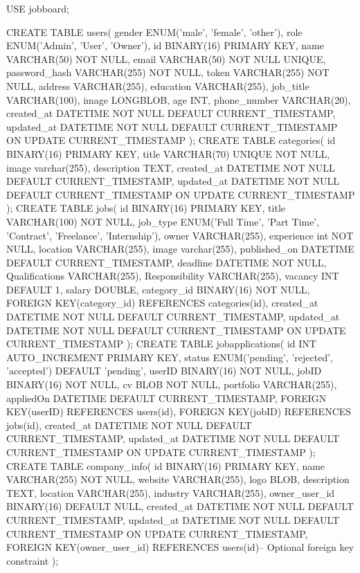 USE jobboard;

CREATE TABLE users(
    gender ENUM('male', 'female', 'other'),
    role ENUM('Admin', 'User', 'Owner'),
    id BINARY(16) PRIMARY KEY,
    name VARCHAR(50) NOT NULL,
    email VARCHAR(50) NOT NULL UNIQUE,
    password_hash VARCHAR(255) NOT NULL,
    token VARCHAR(255) NOT NULL,
    address VARCHAR(255),
    education VARCHAR(255),
    job_title VARCHAR(100),
    image LONGBLOB,
    age INT,
    phone_number VARCHAR(20),
    created_at DATETIME NOT NULL DEFAULT CURRENT_TIMESTAMP,
    updated_at DATETIME NOT NULL DEFAULT CURRENT_TIMESTAMP ON UPDATE CURRENT_TIMESTAMP
);
CREATE TABLE categories(
    id BINARY(16) PRIMARY KEY,
    title VARCHAR(70) UNIQUE NOT NULL,
    image varchar(255),
    description TEXT,
    created_at DATETIME NOT NULL DEFAULT CURRENT_TIMESTAMP,
    updated_at DATETIME NOT NULL DEFAULT CURRENT_TIMESTAMP ON UPDATE CURRENT_TIMESTAMP
);
CREATE TABLE jobs(
    id BINARY(16) PRIMARY KEY,
    title VARCHAR(100) NOT NULL,
    job_type ENUM('Full Time', 'Part Time', 'Contract', 'Freelance', 'Internship'),
    owner VARCHAR(255),
    experience int NOT NULL,
    location VARCHAR(255),
    image varchar(255),
    published_on DATETIME DEFAULT CURRENT_TIMESTAMP,
    deadline DATETIME NOT NULL,
    Qualifications VARCHAR(255),
    Responsibility VARCHAR(255),
    vacancy INT DEFAULT 1, salary DOUBLE, category_id BINARY(16) NOT NULL,
    FOREIGN KEY(category_id) REFERENCES categories(id),
    created_at DATETIME NOT NULL DEFAULT CURRENT_TIMESTAMP,
    updated_at DATETIME NOT NULL DEFAULT CURRENT_TIMESTAMP ON UPDATE CURRENT_TIMESTAMP
);
CREATE TABLE jobapplications(
        id INT AUTO_INCREMENT PRIMARY KEY,
        status ENUM('pending', 'rejected', 'accepted') DEFAULT 'pending',
        userID BINARY(16) NOT NULL,
        jobID BINARY(16) NOT NULL,
        cv BLOB NOT NULL,
        portfolio VARCHAR(255),
        appliedOn DATETIME DEFAULT CURRENT_TIMESTAMP,
        FOREIGN KEY(userID) REFERENCES users(id),
        FOREIGN KEY(jobID) REFERENCES jobs(id),
        created_at DATETIME NOT NULL DEFAULT CURRENT_TIMESTAMP,
        updated_at DATETIME NOT NULL DEFAULT CURRENT_TIMESTAMP ON UPDATE CURRENT_TIMESTAMP
);
CREATE TABLE company_info(
        id BINARY(16) PRIMARY KEY,
        name VARCHAR(255) NOT NULL,
        website VARCHAR(255),
        logo BLOB,
        description TEXT,
        location VARCHAR(255),
        industry VARCHAR(255),
        owner_user_id BINARY(16) DEFAULT NULL,
        created_at DATETIME NOT NULL DEFAULT CURRENT_TIMESTAMP,
        updated_at DATETIME NOT NULL DEFAULT CURRENT_TIMESTAMP ON UPDATE CURRENT_TIMESTAMP,
        FOREIGN KEY(owner_user_id) REFERENCES users(id)-- Optional foreign key constraint
);